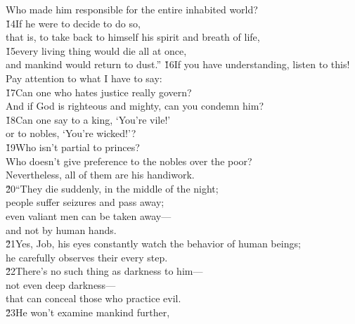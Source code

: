 \begin{poetry}
\poemll    Who made him responsible for the entire inhabited world? \\
\poeml \v{14}If he were to decide to do so, \\
\poemll    that is, to take back to himself his spirit and breath of life, \\
\poeml \v{15}every living thing would die all at once, \\
\poemll    and mankind would return to dust.''
\poeml \v{16}If you have understanding, listen to this! \\
\poemll    Pay attention to what I have to say: \\
\poeml \v{17}Can one who hates justice really govern? \\
\poemll    And if God is righteous and mighty, can you condemn him? \\
\poeml \v{18}Can one say to a king, `You're vile!' \\
\poemll    or to nobles, `You're wicked!'? \\
\poeml \v{19}Who isn't partial to princes? \\
\poemll    Who doesn't give preference to the nobles over the poor? \\
\poemlll       Nevertheless, all of them are his handiwork. \\
\poeml \v{20}``They die suddenly, in the middle of the night; \\
\poemll    people suffer seizures and pass away; \\
\poeml even valiant men can be taken away--- \\
\poemll    and not by human hands. \\
\poeml \v{21}Yes, Job, his eyes constantly watch the behavior of human beings; \\
\poemll    he carefully observes their every step. \\
\poeml \v{22}There's no such thing as darkness to him--- \\
\poemll    not even deep darkness--- \\
\poemlll       that can conceal those who practice evil. \\
\poeml \v{23}He won't examine mankind further, \\

\end{poetry}
